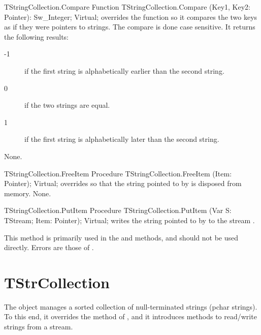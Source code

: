 \begin{function}{TStringCollection.Compare}
\Declaration
Function TStringCollection.Compare (Key1, Key2: Pointer): Sw\_Integer; Virtual;
\Description
{} overrides the  function so it compares 
the two keys as if they were pointers to strings. The compare is done case
sensitive. It returns the following results:
\begin{description}
\item[-1] if the first string is alphabetically earlier  than the second
string.
\item[0] if the two strings are equal.
\item[1] if the first string is alphabetically later than the second string.
\end{description}
\Errors
None.
\SeeAlso
{}
\end{function}

\begin{procedure}{TStringCollection.FreeItem}
\Declaration
Procedure TStringCollection.FreeItem (Item: Pointer); Virtual;
\Description
{} overrides  so that the string pointed
to by  is disposed from memory.
\Errors
None.
\SeeAlso
{}
\end{procedure}

\begin{procedure}{TStringCollection.PutItem}
\Declaration
Procedure TStringCollection.PutItem (Var S: TStream; Item: Pointer); Virtual;
\Description
{} writes the string pointed to by  to the stream
. 

This method is primarily used in the  and  methods, 
and should not be used directly.
\Errors
Errors are those of .
\SeeAlso
{}
\end{procedure}


\section{TStrCollection}
\label{se:TStrCollection}

The  object manages a sorted collection
of null-terminated strings (pchar strings).  
To this end, it overrides the 
method of , and it introduces methods to read/write
strings from a stream.

